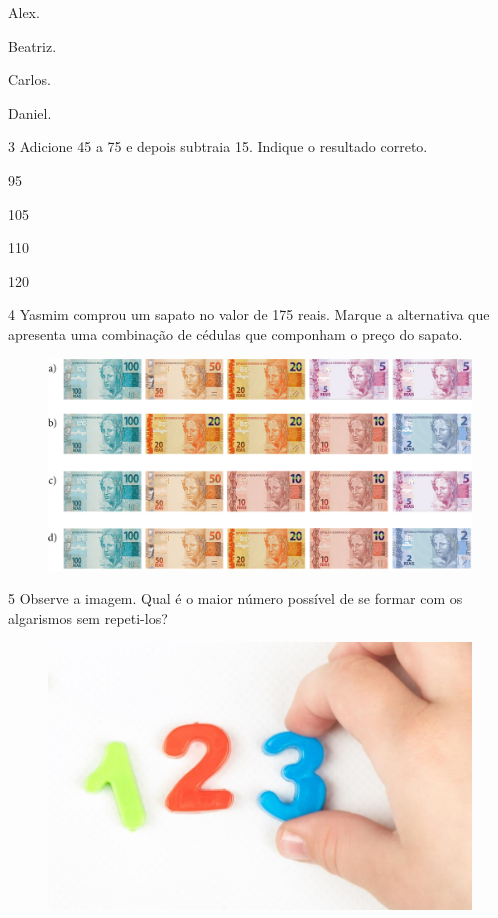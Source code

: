 \begin{escolha}[itemsep=-5pt]
\begin{multicols}{2}
\item Alex.

\item Beatriz.

\item Carlos.

\item Daniel.
\end{multicols}
\end{escolha}

\pagebreak

\num{3} Adicione 45 a 75 e depois subtraia 15. Indique o resultado correto.

\begin{escolha}[itemsep=-5pt]
\item 95

\item 105

\item 110

\item 120
\end{escolha}

\num{4} Yasmim comprou um sapato no valor de 175 reais. Marque a alternativa que apresenta uma combinação de cédulas que componham o preço do sapato.

\begin{figure}[H]
\centering
\includegraphics[width=\textwidth]{./media/image115.png}
\end{figure}

\num{5} Observe a imagem. Qual é o maior número possível de se formar com os
algarismos sem repeti-los?

\begin{figure}[H]
\centering
\includegraphics[width=.6\textwidth]{./media/image114.png}
\end{figure}

